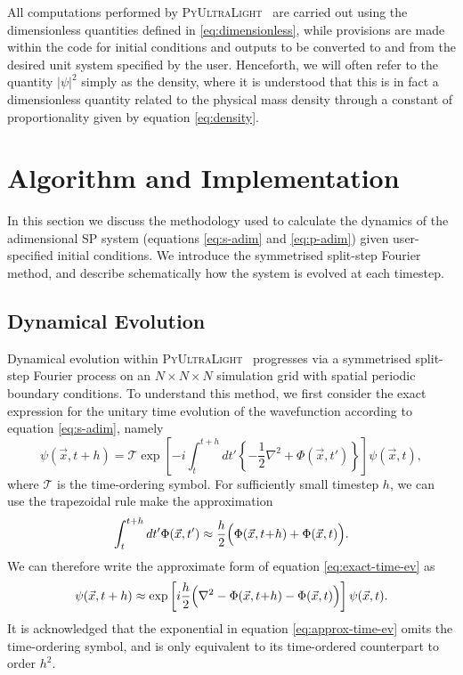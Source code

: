 \documentclass[a4paper,11pt]{article}
\newcommand{\PyUltraLight}{\textsc{PyUltraLight }}
\begin{document}
All computations performed by \PyUltraLight\ are carried out using the dimensionless quantities defined in \ref{eq:dimensionless}, while provisions are made within the code for initial conditions and outputs to be converted to and from the desired unit system specified by the user. Henceforth, we will often refer to the quantity $\vert\psi\vert^2$ simply as the density, where it is understood that this is in fact a dimensionless quantity related to the physical mass density through a constant of proportionality given by equation \ref{eq:density}.




\section{Algorithm and Implementation}\label{sec:implementation}

In this section we discuss the methodology used to calculate the dynamics of the adimensional SP system (equations \ref{eq:s-adim} and \ref{eq:p-adim}) given user-specified initial conditions. We introduce the symmetrised split-step Fourier method, and describe schematically how the system is evolved at each timestep. 

\subsection{Dynamical Evolution}\label{sec:dynamics}

Dynamical evolution within \PyUltraLight\ progresses via a symmetrised split-step Fourier process on an $N\times N\times N$ simulation grid with spatial periodic boundary conditions. To understand this method, we first consider the exact expression for the unitary time evolution of the wavefunction according to equation \ref{eq:s-adim}, namely
\begin{equation}\label{eq:exact-time-ev}
    \psi(\vec{x},t+h)=\mathcal{T}\operatorname{exp}\left[-i\int_t^{t+h}dt'\left\{-\frac{1}{2}\nabla^2+\Phi(\vec{x},t')\right\}\right]\psi(\vec{x},t),
\end{equation}
where $\mathcal{T}$ is the time-ordering symbol. For sufficiently small timestep $h$, we can use the trapezoidal rule make the approximation
\begin{equation}
    \int_t^{t+h}dt'\Phi(\vec{x},t')\approx \frac{h}{2}\Big(\Phi(\vec{x},t\hspace*{-.2em}+\hspace*{-.2em}h)+\Phi(\vec{x},t)\Big).
\end{equation}
We can therefore write the approximate form of equation \ref{eq:exact-time-ev} as
\begin{equation}\label{eq:approx-time-ev}
    \psi(\vec{x},t+h)\approx \operatorname{exp}\left[i\frac{h}{2}\Big(\nabla^2-\Phi(\vec{x},t\hspace*{-.2em}+\hspace*{-.2em}h)-\Phi(\vec{x},t)\Big)\right]\psi(\vec{x},t).
\end{equation}
It is acknowledged that the exponential in equation \ref{eq:approx-time-ev} omits the time-ordering symbol, and is only equivalent to its time-ordered counterpart to order $h^2$.
\end{document}
